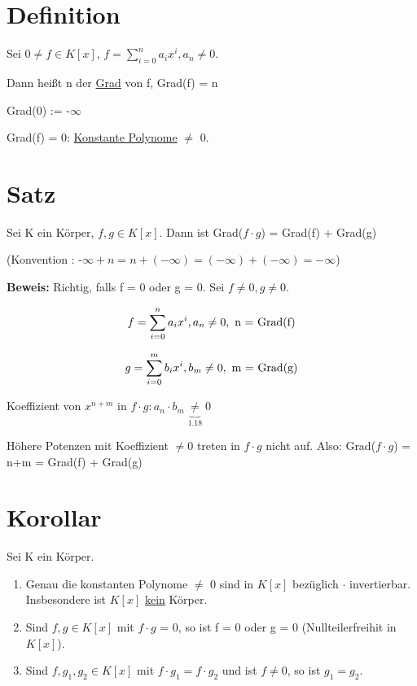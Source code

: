\documentclass[a4paper, openany]{book}
\begin{document}
  \section{Definition}

  Sei $0 \neq f \in K[x]$, $f = \sum_{i=0}^{n} a_ix^i, a_n \neq 0$.

  Dann heißt n der \underline{Grad} von f, Grad(f) = n

  \par \medskip

  Grad(0) := -$\infty$

  Grad(f) = 0: \underline{Konstante Polynome} $\neq$ 0.

  \section{Satz}

  Sei K ein Körper, $f,g \in K[x]$. Dann ist Grad($f \cdot g$) = Grad(f) + Grad(g)

  (Konvention : -$\infty +n = n+ (- \infty) = (-\infty) +(- \infty) = - \infty$)

  \par \medskip

  \textbf{Beweis:} Richtig, falls f = 0 oder g = 0. Sei $f \neq 0, g \neq 0$.

  \begin{equation}
    f = \sum_{i=0}^{n} a_ix^i, a_n \neq 0, \textnormal{ n = Grad(f)}
  \end{equation}

  \begin{equation}
   g = \sum_{i=0}^{m} b_ix^i, b_m \neq 0, \textnormal{ m = Grad(g)}
  \end{equation}

  Koeffizient von $x^{n+m}$ in $f \cdot g: a_n \cdot b_m \underbrace{\neq}_{1.18} 0$

  Höhere Potenzen mit Koeffizient $\neq 0$ treten in $f \cdot g$ nicht auf. Also: Grad($f \cdot g$) = n+m = Grad(f) + Grad(g)

  \section{Korollar}

  Sei K ein Körper.

  \begin{enumerate}[label=(\alph*)]
    \item Genau die konstanten Polynome $\neq$ 0 sind in $K[x]$ bezüglich $\cdot$ invertierbar. Insbesondere ist $K[x]$ \underline{kein} Körper.

    \item Sind $f,g \in K[x]$ mit $f \cdot g$ = 0, so ist f = 0 oder g = 0 (Nullteilerfreihit in $K[x]$).

    \item Sind $f,g_1,g_2 \in K[x]$ mit $f \cdot g_1 = f \cdot g_2$ und ist $f \neq 0$, so ist $g_1 = g_2$.
  \end{enumerate}
\end{document}
